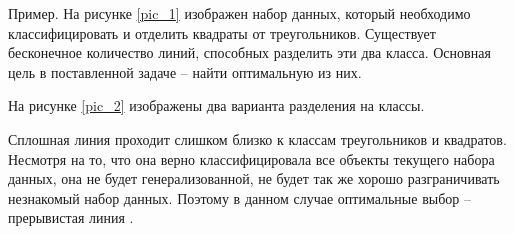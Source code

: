 Пример. На рисунке \ref{pic_1} изображен набор данных, который необходимо классифицировать и отделить квадраты от треугольников. Существует бесконечное количество линий, способных разделить эти два класса. Основная цель в поставленной задаче – найти оптимальную из них.

\begin{figure} [H]
\end{figure}

На рисунке \ref{pic_2} изображены два варианта разделения на классы.

\begin{figure} [H]
\end{figure}

Сплошная линия проходит слишком близко к классам треугольников и квадратов. Несмотря на то, что она верно классифицировала все объекты текущего набора данных, она не будет генерализованной, не будет так же хорошо разграничивать незнакомый набор данных. Поэтому в данном случае оптимальные выбор -- прерывистая линия \cite{all}.

